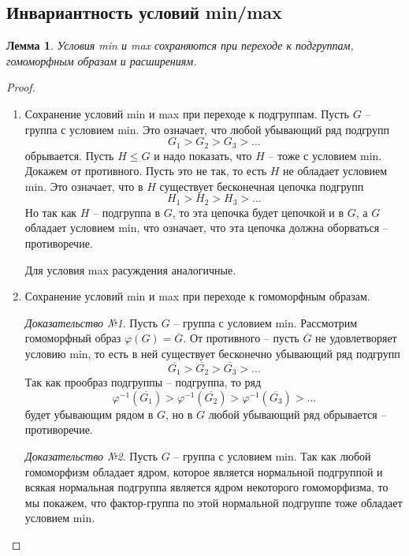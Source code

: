 \documentclass{article}
\newtheorem{lemma}{Лемма}[section]
\begin{document}
\subsection{Инвариантность условий min/max}

\begin{lemma} \label{fwenuo}
    Условия min и max сохраняются при переходе к подгруппам, гомоморфным образам и расширениям.
\end{lemma}
\begin{proof}
    \hfill
    \begin{enumerate}
        \item Сохранение условий min и max при переходе к подгруппам. Пусть $G$ -- группа с условием min. Это означает, что любой убывающий ряд подгрупп $$ G_1 > G_2 > G_3 > \ldots $$ обрывается. Пусть $H \leqslant G$ и надо показать, что $H$ -- тоже с условием min. Докажем от противного. Пусть это не так, то есть $H$ не обладает условием min. Это означает, что в $H$ существует бесконечная цепочка подгрупп
        \[
            H_1 > H_2 > H_3 > \ldots
        \]
        Но так как $H$ -- подгруппа в $G$, то эта цепочка будет цепочкой и в $G$, а $G$ обладает условием min, что означает, что эта цепочка должна оборваться -- противоречие.

        Для условия max расуждения аналогичные.

        \item Сохранение условий min и max при переходе к гомоморфным образам.
        
        \textit{Доказательство №1}. Пусть $G$ -- группа с условием min. Рассмотрим гомоморфный образ $\varphi(G) = \overline{G}$. От противного -- пусть $\overline{G}$ не удовлетворяет условию min, то есть в ней существует бесконечно убывающий ряд подгрупп
        \[
            \overline{G_1} > \overline{G_2} > \overline{G_3} > \ldots
        \]
        Так как прообраз подгруппы -- подгруппа, то ряд
        \[
            \varphi^{-1} (\overline{G_1}) > \varphi^{-1} (\overline{G_2}) > \varphi^{-1} (\overline{G_3}) > \ldots
        \]
        будет убывающим рядом в $G$, но в $G$ любой убывающий ряд обрывается -- противоречие.

        \textit{Доказательство №2}. Пусть $G$ -- группа с условием min. Так как любой гомоморфизм обладает ядром, которое является нормальной подгруппой и всякая нормальная подгруппа является ядром некоторого гомоморфизма, то мы покажем, что фактор-группа по этой нормальной подгруппе тоже обладает условием min.
        

\end{enumerate}
\end{proof}
\end{document}
